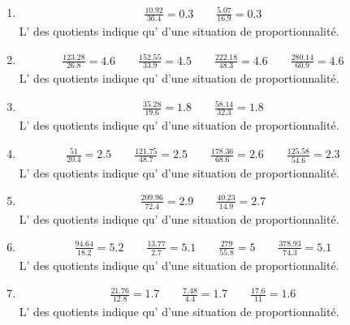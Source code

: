 {\begin{enumerate}
\item\begin{align*}
\frac{10.92}{36.4} = 0.3\qquad \frac{5.07}{16.9} = 0.3\qquad 
\end{align*}
L' des quotients indique qu' d'une situation de proportionnalité.

\item\begin{align*}
\frac{123.28}{26.8} = 4.6\qquad \frac{152.55}{33.9} = 4.5\qquad \frac{222.18}{48.3} = 4.6\qquad \frac{280.14}{60.9} = 4.6\qquad 
\end{align*}
L' des quotients indique qu' d'une situation de proportionnalité.

\item\begin{align*}
\frac{35.28}{19.6} = 1.8\qquad \frac{58.14}{32.3} = 1.8\qquad 
\end{align*}
L' des quotients indique qu' d'une situation de proportionnalité.

\item\begin{align*}
\frac{51}{20.4} = 2.5\qquad \frac{121.75}{48.7} = 2.5\qquad \frac{178.36}{68.6} = 2.6\qquad \frac{125.58}{54.6} = 2.3\qquad 
\end{align*}
L' des quotients indique qu' d'une situation de proportionnalité.

\item\begin{align*}
\frac{209.96}{72.4} = 2.9\qquad \frac{40.23}{14.9} = 2.7\qquad 
\end{align*}
L' des quotients indique qu' d'une situation de proportionnalité.

\item\begin{align*}
\frac{94.64}{18.2} = 5.2\qquad \frac{13.77}{2.7} = 5.1\qquad \frac{279}{55.8} = 5\qquad \frac{378.93}{74.3} = 5.1\qquad 
\end{align*}
L' des quotients indique qu' d'une situation de proportionnalité.

\item\begin{align*}
\frac{21.76}{12.8} = 1.7\qquad \frac{7.48}{4.4} = 1.7\qquad \frac{17.6}{11} = 1.6\qquad 
\end{align*}
L' des quotients indique qu' d'une situation de proportionnalité.


\end{enumerate}}
